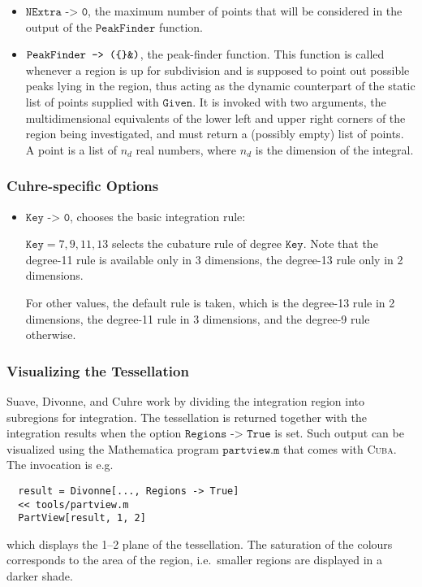 \documentclass[12pt]{article}
\newcommand\cuba{\textsc{Cuba}}
\newcommand\ie{i.e.\ }
\newcommand\eg{e.g.\ }
\newcommand\lbrac{\symbol{123}}
\newcommand\rbrac{\symbol{125}}
\newcommand\Code[1]{\ensuremath{\texttt{#1}}}
\newcommand\Option[2]{\item\Code{#1 -> #2},}
\begin{document}
\begin{itemize}
\Option{NExtra}{0}
the maximum number of points that will be considered in the output of 
the \Code{PeakFinder} function.

\Option{PeakFinder}{(\lbrac\rbrac\&)}
the peak-finder function.  This function is called whenever a region is
up for subdivision and is supposed to point out possible peaks lying in
the region, thus acting as the dynamic counterpart of the static list of
points supplied with \Code{Given}.  It is invoked with two arguments,
the multidimensional equivalents of the lower left and upper right
corners of the region being investigated, and must return a (possibly
empty) list of points.  A point is a list of $n_d$ real numbers, where 
$n_d$ is the dimension of the integral.
\end{itemize}


\subsubsection{Cuhre-specific Options}

\begin{itemize}
\Option{Key}{0}
chooses the basic integration rule:

$\Code{Key} = 7, 9, 11, 13$ selects the cubature rule of degree 
\Code{Key}.  Note that the degree-11 rule is available only in 3
dimensions, the degree-13 rule only in 2 dimensions.

For other values, the default rule is taken, which is the degree-13 rule 
in 2 dimensions, the degree-11 rule in 3 dimensions, and the degree-9 
rule otherwise.
\end{itemize}


\subsubsection{Visualizing the Tessellation}

Suave, Divonne, and Cuhre work by dividing the integration region into 
subregions for integration.  The tessellation is returned together with 
the integration results when the option \Code{Regions -> True} is
set.  Such output can be visualized using the Mathematica program 
\Code{partview.m} that comes with \cuba.  The invocation is \eg
\begin{verbatim}
  result = Divonne[..., Regions -> True]
  << tools/partview.m
  PartView[result, 1, 2]
\end{verbatim}
which displays the 1--2 plane of the tessellation.  The saturation of 
the colours corresponds to the area of the region, \ie smaller regions
are displayed in a darker shade.
\end{document}
